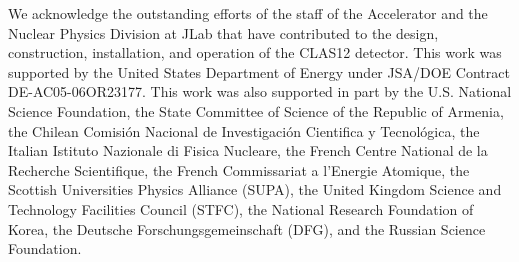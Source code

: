 \documentclass[final,3p]{elsarticle}
\begin{document}
\begin{twocolumn}
We acknowledge the outstanding efforts of the staff of the Accelerator and the Nuclear Physics Division at JLab
that have contributed to the design, construction, installation, and operation of the CLAS12 detector. This work was
supported by the United States Department of Energy under JSA/DOE Contract DE-AC05-06OR23177. This work
was also supported in part by the U.S. National Science Foundation, the State Committee of Science of the Republic
of Armenia, the Chilean Comisi\'on Nacional de Investigaci\'on Cientifica y Tecnol\'ogica, the Italian Istituto
Nazionale di Fisica Nucleare, the French Centre National de la Recherche Scientifique, the French Commissariat a
l'Energie Atomique, the Scottish Universities Physics Alliance (SUPA), the United Kingdom Science and Technology
Facilities Council (STFC), the National Research Foundation of Korea, the Deutsche Forschungsgemeinschaft (DFG),
and the Russian Science Foundation. 

\vfil
\eject


\end{twocolumn}
\end{document}

